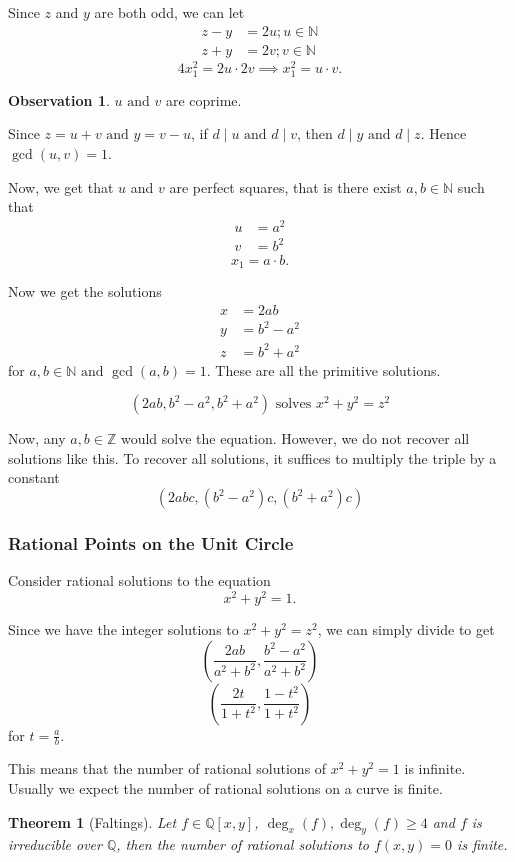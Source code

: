 \documentclass[11pt]{article}
\newtheorem{thm}{Theorem}[section]
\theoremstyle{definition}
\newtheorem{obs}{Observation}[section]
\newcommand{\nl}[0]{\vspace{12pt}}
\newcommand{\et}[0]{\text{ and }}
\newcommand{\QQ}{\mathbb{Q}}
\newcommand{\ZZ}{\mathbb{Z}}
\newcommand{\NN}{\mathbb{N}}
\begin{document}
\nl
	Since $z$ and $y$ are both odd, we can let 
	\begin{align*}
		z-y &= 2u ; u\in\NN \\
		z+y &= 2v ; v\in\NN
	\end{align*}
	$$ 4x_1^2 = 2u \cdot 2v  \implies  x_1^2 = u \cdot v . $$

\begin{obs}
	$u \et v$ are coprime. 
\end{obs}
\proof
	Since $z = u+v \et y = v-u$, if $d \mid u \et d \mid v$, then $d\mid y \et d\mid z$.
	Hence $\gcd(u,v) = 1$.
\qedhere

\nl
	Now, we get that $u$ and $v$ are perfect squares, that is there exist $a,b\in\NN$ such that 
	\begin{align*}
		u &= a^2 \\
		v &= b^2
	\end{align*}
	$$ x_1 = a \cdot b . $$

	Now we get the solutions 
	\begin{align*}
		x &= 2ab \\
		y &= b^2 - a^2 \\
		z &= b^2 + a^2
	\end{align*}
	for $a,b\in\NN \et \gcd(a,b) = 1$. 
	These are all the primitive solutions. 

	$$ (2ab, b^2-a^2, b^2+a^2) \text{ solves } x^2 + y^2 = z^2 $$

	Now, any $a,b\in\ZZ$ would solve the equation. 
	However, we do not recover all solutions like this. 
	To recover all solutions, it suffices to multiply the triple by a constant
	$$ (2abc, (b^2-a^2)c, (b^2+a^2)c) $$

\subsubsection{Rational Points on the Unit Circle}
	
	Consider rational solutions to the equation
	$$ x^2 + y^2 = 1 . $$

	Since we have the integer solutions to $x^2 + y^2 = z^2$, we can simply divide to get
	$$ \left( \frac{2ab}{a^2+b^2} , \frac{b^2-a^2}{a^2+b^2} \right) $$
	$$ \left( \frac{2t}{1 + t^2} , \frac{1 - t^2}{1 + t^2} \right) $$
	for $t = \frac{a}{b}$. 

	This means that the number of rational solutions of $x^2 + y^2 = 1$ is infinite. 
	Usually we expect the number of rational solutions on a curve is finite.

	\begin{thm}[Faltings]
		Let $f \in \QQ[x,y]$, $\deg_x(f), \deg_y(f) \ge 4$ and $f$ is irreducible over $\QQ$, 
		then the number of rational solutions to $f(x,y) = 0$ is finite. 
	\end{thm}
\end{document}
